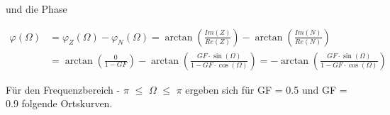 \noindent und die Phase

\begin{equation}\label{eq:eightthirtytwo}
\begin{split}
\varphi \left(\Omega \right)& =\varphi _{Z} \left(\Omega \right)-\varphi _{N} \left(\Omega \right)=\arctan \left(\frac{Im(Z)}{Re(Z)} \right)-\arctan \left(\frac{Im(N)}{Re(N)} \right)\\ 
& =\arctan \left(\frac{0}{1-GF} \right)-\arctan \left(\frac{GF\cdot \sin \left(\Omega \right)}{1-GF\cdot \cos \left(\Omega \right)} \right)=-\arctan \left(\frac{GF\cdot \sin \left(\Omega \right)}{1-GF\cdot \cos \left(\Omega \right)} \right)
\end{split}
\end{equation}

\noindent F\"{u}r den Frequenzbereich - $\pi$ $\mathrm{\le}$ $\Omega$ $\mathrm{\le}$ $\pi$ ergeben sich f\"{u}r GF = 0.5 und GF = 0.9 folgende Ortskurven.
